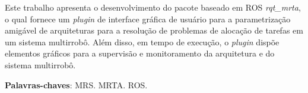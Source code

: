 \newpage
\begin{resumo}
    Este trabalho apresenta o desenvolvimento do pacote baseado em ROS \textit{rqt\_mrta}, o qual fornece um \textit{plugin} de interface gráfica de usuário para a parametrização amigável de arquiteturas para a resolução de problemas de alocação de tarefas em um sistema multirrobô. Além disso, em tempo de execução, o \textit{plugin} dispõe elementos gráficos para a supervisão e monitoramento da arquitetura e do sistema multirrobô.
    \vspace{\onelineskip}
    
    \noindent
    \textbf{Palavras-chaves}: MRS. MRTA. ROS.
\end{resumo}
\newpage